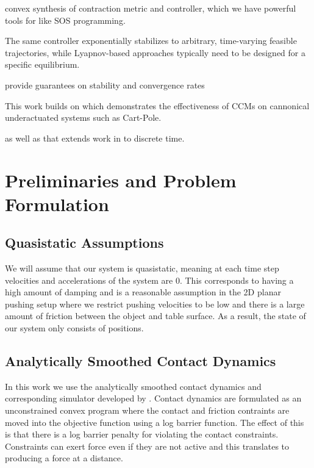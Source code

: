 \documentclass[journal]{IEEEtran}
\begin{document}
convex synthesis of contraction metric and controller, which we have powerful tools for like SOS programming.

The same controller exponentially stabilizes to arbitrary, time-varying feasible trajectories, while Lyapnov-based approaches typically need to be designed for a specific equilibrium.

provide guarantees on stability and convergence rates

This work builds on \autocite{manchesterUnifyingRobotTrajectory2018} which demonstrates the effectiveness of CCMs on cannonical underactuated systems such as Cart-Pole.

as well as \autocite{weiControlContractionMetric2021} that extends work in \autocite{manchesterControlContractionMetrics2017} to discrete time.

\section{Preliminaries and Problem Formulation}
\subsection{Quasistatic Assumptions}
We will assume that our system is quasistatic, meaning at each time step velocities and accelerations of the system are 0. This corresponds to having a high amount of damping and is a reasonable assumption in the 2D planar pushing setup where we restrict pushing velocities to be low and there is a large amount of friction between the object and table surface. As a result, the state of our system only consists of positions.

\subsection{Analytically Smoothed Contact Dynamics}
In this work we use the analytically smoothed contact dynamics and corresponding simulator developed by \autocite{pangGlobalPlanningContactRich2023}. Contact dynamics are formulated as an unconstrained convex program where the contact and friction contraints are moved into the objective function using a log barrier function. The effect of this is that there is a log barrier penalty for violating the contact constraints. Constraints can exert force even if they are not active and this translates to producing a force at a distance.
\end{document}
